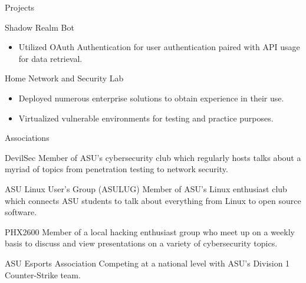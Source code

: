 \documentclass{article}
\newlength{\tabin}
\newlength{\secsep}
\newcommand{\lineunder}{\vspace*{-8pt} \\ \hspace*{-6pt} \hrulefill \\ \vspace*{-15pt}}
\newenvironment{tabbedsection}[1]{
  \begin{list}{}{
      \setlength{\itemsep}{0pt}
      \setlength{\labelsep}{0pt}
      \setlength{\labelwidth}{0pt}
      \setlength{\leftmargin}{\tabin}
      \setlength{\rightmargin}{\tabin}
      \setlength{\listparindent}{0pt}
      \setlength{\parsep}{0pt}
      \setlength{\parskip}{0pt}
      \setlength{\partopsep}{0pt}
      \setlength{\topsep}{#1}
    }
  \item[]
}{\end{list}}
\newenvironment{resume_section}[1]{
  \filbreak
  \vspace{2\secsep}
  \textsc{\large#1}
  \lineunder
  \begin{tabbedsection}{\secsep}
}{\end{tabbedsection}}
\newenvironment{resume_subsection}[2][]{
  \textbf{#2} \hfill {\normalsize #1} \hspace{-5em}
  \begin{tabbedsection}{0.5\secsep}
}{\end{tabbedsection}}
\newenvironment{subitems}{
  \renewcommand{\labelitemi}{-}
  \begin{itemize}
      \setlength{\labelsep}{1em}
}{\end{itemize}}
\begin{document}
\begin{resume_section}{Projects}
\begin{resume_subsection}{Shadow Realm Bot}
\begin{subitems}
			\item Utilized OAuth Authentication for user authentication paired with API usage for data retrieval.
		\end{subitems}
	\end{resume_subsection}
	\vspace{3\secsep}
  	\begin{resume_subsection}{Home Network and Security Lab}
  		\begin{subitems}
  			\item Deployed numerous enterprise solutions to obtain experience in their use.
  			\item Virtualized vulnerable environments for testing and practice purposes.
  		\end{subitems}
  	\end{resume_subsection}
\end{resume_section}

\vspace{3\secsep}

\begin{resume_section}{Associations}
  	\begin{resume_subsection}{DevilSec}
		Member of ASU's cybersecurity club which regularly hosts talks about a myriad of topics from penetration testing to network security.
  	\end{resume_subsection}
  	\vspace{2\secsep}
  	\begin{resume_subsection}{ASU Linux User's Group (ASULUG)}
  	Member of ASU's Linux enthusiast club which connects ASU students to talk about everything from Linux to open source software.
  	\end{resume_subsection}
  	\vspace{2\secsep}
  	\begin{resume_subsection}{PHX2600}
  	Member of a local hacking enthusiast group who meet up on a weekly basis to discuss and view presentations on a variety of cybersecurity topics.
  	\end{resume_subsection}
  	\vspace{2\secsep}
  	\begin{resume_subsection}{ASU Esports Association}
  		Competing at a national level with ASU's Division 1 Counter-Strike team.
  	\end{resume_subsection}
\end{resume_section}
\end{document}
